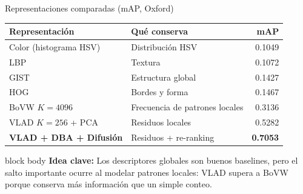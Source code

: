 \documentclass[aspectratio=169]{beamer}
\newcommand{\ideaclave}[1]{%
  \vfill
  \begin{beamercolorbox}[wd=\textwidth,sep=0.35em]{block body}
    \small\textbf{Idea clave:} #1
  \end{beamercolorbox}
}
\begin{document}
\begin{frame}{Representaciones comparadas (mAP, Oxford)}
  \centering
  \begin{table}
    \scriptsize
    \begin{tabular}{lp{4.2cm}r}
      \toprule
      \textbf{Representaci\'on} & \textbf{Qu\'e conserva} & \textbf{mAP} \\
      \midrule
      Color (histograma HSV)                 & Distribuci\'on HSV                & 0.1049 \\
      LBP                                     & Textura                           & 0.1072 \\
      GIST                                    & Estructura global                 & 0.1427 \\
      HOG                                     & Bordes y forma                    & 0.1467 \\
      BoVW $K{=}4096$                         & Frecuencia de patrones locales     & 0.3136 \\
      VLAD $K{=}256$ + PCA                    & Residuos locales                  & 0.5282 \\
      \rowcolor{ProjLight}
      \textbf{VLAD + DBA + Difusi\'on}        & Residuos + re-ranking             & \textbf{0.7053} \\
      \bottomrule
    \end{tabular}
  \end{table}
  \ideaclave{Los descriptores globales son buenos baselines, pero el salto importante ocurre al modelar patrones locales: VLAD supera a BoVW porque conserva m\'as informaci\'on que un simple conteo.}
\end{frame}
\end{document}
